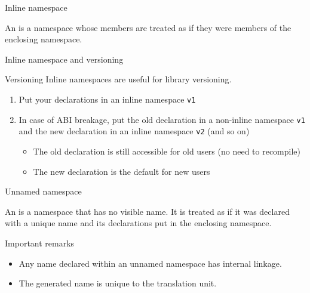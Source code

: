 \begin{frame}{Inline namespace}{}
  \begin{definition}
    An  is a namespace whose members are treated as if they were members of the enclosing namespace.
  \end{definition}

  \begin{example}
  \end{example}
\end{frame}

\begin{frame}{Inline namespace and versioning}{}
  \begin{block}{Versioning}
    Inline namespaces are useful for library versioning.
    \begin{enumerate}
    \item
      Put your declarations in an inline namespace \lstinline!v1!
    \item
      In case of ABI breakage, put the old declaration in a non-inline namespace \lstinline!v1! and the new declaration in an inline namespace \lstinline!v2! (and so on)
      \begin{itemize}
      \item
        The old declaration is still accessible for old users (no need to recompile)
      \item
        The new declaration is the default for new users
      \end{itemize}
    \end{enumerate}
  \end{block}
  \begin{example}
  \end{example}
\end{frame}

\begin{frame}{Unnamed namespace}{}
  \begin{definition}
    An  is a namespace that has no visible name. It is treated as if it was declared with a unique name and its declarations put in the enclosing namespace.
  \end{definition}
  \begin{block}{Important remarks}
    \begin{itemize}
    \item
      Any name declared within an unnamed namespace has internal linkage. %
    \item
      The generated name is unique to the translation unit.
    \end{itemize}
  \end{block}
  \begin{example}
  \end{example}
\end{frame}


